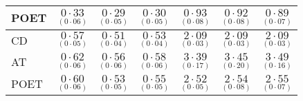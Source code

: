 \documentclass[11pt,oneside]{amsart}
\begin{document}
\begin{table}[htbp!]
\begin{multicols}{7}
\begin{tabular}{|p{1.92cm}|p{1.92cm}|p{1.92cm}|p{1.92cm}|p{1.92cm}|p{1.92cm}|p{1.92cm}|}
POET & ${\underset{(0\cdot06)}{0\cdot33}}$ & ${\underset{(0\cdot05)}{0\cdot29}}$ & ${\underset{(0\cdot05)}{0\cdot30}}$ & ${\underset{(0\cdot08)}{0\cdot93}}$ & ${\underset{(0\cdot08)}{0\cdot92}}$ & ${\underset{(0\cdot07)}{0\cdot89}}$ \\ 
\hline
\hline
CD & ${\underset{(0\cdot05)}{0\cdot57}}$ & ${\underset{(0\cdot04)}{0\cdot51}}$ & ${\underset{(0\cdot04)}{0\cdot53}}$ & ${\underset{(0\cdot03)}{2\cdot09}}$ & ${\underset{(0\cdot03)}{2\cdot09}}$ & ${\underset{(0\cdot03)}{2\cdot09}}$ \\  
AT & ${\underset{(0\cdot06)}{0\cdot62}}$ & ${\underset{(0\cdot06)}{0\cdot56}}$ & ${\underset{(0\cdot06)}{0\cdot58}}$ & ${\underset{(0\cdot17)}{3\cdot39}}$ & ${\underset{(0\cdot20)}{3\cdot45}}$ & ${\underset{(0\cdot16)}{3\cdot49}}$ \\ 
POET & ${\underset{(0\cdot06)}{0\cdot60}}$ & ${\underset{(0\cdot05)}{0\cdot53}}$ & ${\underset{(0\cdot05)}{0\cdot55}}$ & ${\underset{(0\cdot05)}{2\cdot52}}$ & ${\underset{(0\cdot08)}{2\cdot54}}$ & ${\underset{(0\cdot07)}{2\cdot55}}$ \\ 
\hline
\end{tabular}
\end{multicols}
\end{table}
\end{document}
